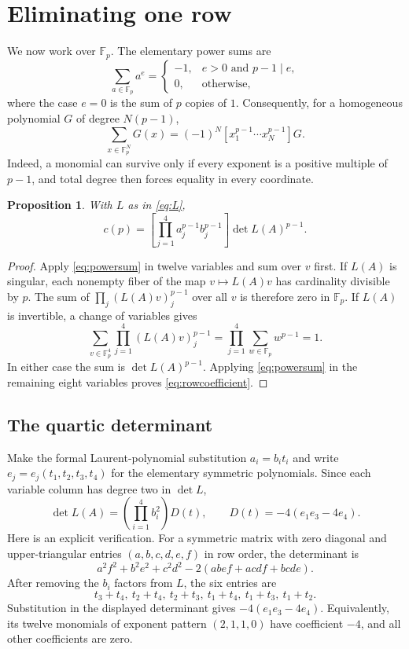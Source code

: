 \documentclass[11pt]{article}
\newtheorem{proposition}[theorem]{Proposition}
\theoremstyle{remark}\newtheorem{remark}[theorem]{Remark}
\newcommand{\F}{\mathbb F}
\numberwithin{equation}{section}
\begin{document}
\section{Eliminating one row}
We now work over $\F_p$. The elementary power sums are
\[
 \sum_{a\in\F_p}a^e=
 \begin{cases}
 -1,&e>0\text{ and }p-1\mid e,\\
 0,&\text{otherwise},
 \end{cases}
\]
where the case $e=0$ is the sum of $p$ copies of $1$.
Consequently, for a homogeneous polynomial $G$ of degree $N(p-1)$,
\begin{equation}\label{eq:powersum}
 \sum_{x\in\F_p^N}G(x)=(-1)^N
 [x_1^{p-1}\cdots x_N^{p-1}]G.
\end{equation}
Indeed, a monomial can survive only if every exponent is a positive
multiple of $p-1$, and total degree then forces equality in every
coordinate.

\begin{proposition}\label{prop:row}
With $L$ as in \eqref{eq:L},
\begin{equation}\label{eq:rowcoefficient}
 c(p)=\left[\prod_{j=1}^4a_j^{p-1}b_j^{p-1}\right]
                       \det L(A)^{p-1}.
\end{equation}
\end{proposition}
\begin{proof}
Apply \eqref{eq:powersum} in twelve variables and sum over $v$ first.
If $L(A)$ is singular, each nonempty fiber of the map
$v\mapsto L(A)v$ has cardinality divisible by $p$. The sum of
$\prod_j(L(A)v)_j^{p-1}$ over all $v$ is therefore zero in $\F_p$.
If $L(A)$ is invertible, a change of variables gives
\[
 \sum_{v\in\F_p^4}\prod_{j=1}^4(L(A)v)_j^{p-1}
 =\prod_{j=1}^4\sum_{w\in\F_p}w^{p-1}=1.
\]
In either case the sum is $\det L(A)^{p-1}$. Applying
\eqref{eq:powersum} in the remaining eight variables proves
\eqref{eq:rowcoefficient}.
\end{proof}

\subsection{The quartic determinant}
Make the formal Laurent-polynomial substitution $a_i=b_it_i$ and
write $e_j=e_j(t_1,t_2,t_3,t_4)$ for the elementary symmetric
polynomials. Since each variable column has degree two in $\det L$,
\begin{equation}\label{eq:detquartic}
 \det L(A)=\left(\prod_{i=1}^4b_i^2\right)D(t),\qquad
 D(t)=-4(e_1e_3-4e_4).
\end{equation}
Here is an explicit verification. For a symmetric matrix with zero
diagonal and upper-triangular entries $(a,b,c,d,e,f)$ in row order,
the determinant is
\[
 a^2f^2+b^2e^2+c^2d^2-2(abef+acdf+bcde).
\]
After removing the $b_i$ factors from $L$, the six entries are
\[
 t_3+t_4,\ t_2+t_4,\ t_2+t_3,\
 t_1+t_4,\ t_1+t_3,\ t_1+t_2.
\]
Substitution in the displayed determinant gives
$-4(e_1e_3-4e_4)$. Equivalently, its twelve monomials of exponent
pattern $(2,1,1,0)$ have coefficient $-4$, and all other coefficients
are zero.
\end{document}
